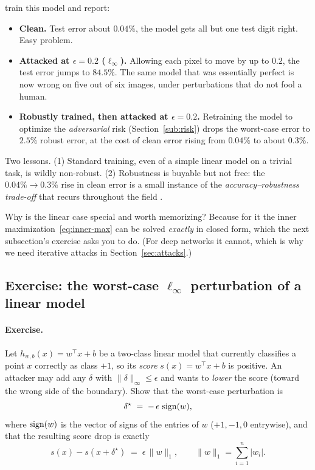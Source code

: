 \begin{example}
\citet{kolter2018adversarial} train this model and report:
\begin{itemize}[nosep]
  \item \textbf{Clean.} Test error about $0.04\%$, the model gets all but one test digit right. Easy problem.
  \item \textbf{Attacked at $\epsilon=0.2$ ($\ell_\infty$).} Allowing each pixel to move by up to $0.2$, the test error jumps to $\mathbf{84.5\%}$. The same model that was essentially perfect is now wrong on five out of six images, under perturbations that do not fool a human.
  \item \textbf{Robustly trained, then attacked at $\epsilon=0.2$.} Retraining the model to optimize the \emph{adversarial} risk (Section~\ref{sub:risk}) drops the worst-case error to $\mathbf{2.5\%}$ robust error, at the cost of clean error rising from $0.04\%$ to about $0.3\%$.
\end{itemize}
Two lessons. (1) Standard training, even of a simple linear model on a trivial task, is wildly non-robust. (2) Robustness is buyable but not free: the $0.04\%\to0.3\%$ rise in clean error is a small instance of the \emph{accuracy--robustness trade-off} that recurs throughout the field \citep{kolter2018adversarial}.
\end{example}

Why is the linear case special and worth memorizing? Because for it the inner maximization~\eqref{eq:inner-max} can be solved \emph{exactly} in closed form, which the next subsection's exercise asks you to do. (For deep networks it cannot, which is why we need iterative attacks in Section~\ref{sec:attacks}.)

\subsection{Exercise: the worst-case $\ell_\infty$ perturbation of a linear model}
\label{sub:exercise-linear}

\paragraph{Exercise.} Let $h_{w,b}(x)=w^\top x + b$ be a two-class linear model that currently classifies a point $x$ correctly as class $+1$, so its \emph{score} $s(x)=w^\top x+b$ is positive. An attacker may add any $\delta$ with $\|\delta\|_\infty\le\epsilon$ and wants to \emph{lower} the score (toward the wrong side of the boundary). Show that the worst-case perturbation is
\[
  \delta^\star \;=\; -\,\epsilon\,\operatorname{sign}(w),
\]
where $\operatorname{sign}(w)$ is the vector of signs of the entries of $w$ ($+1,-1,0$ entrywise), and that the resulting score drop is exactly
\[
  s(x) - s(x+\delta^\star) \;=\; \epsilon\,\|w\|_1, \qquad \|w\|_1 = \sum_{i=1}^n |w_i|.
\]

